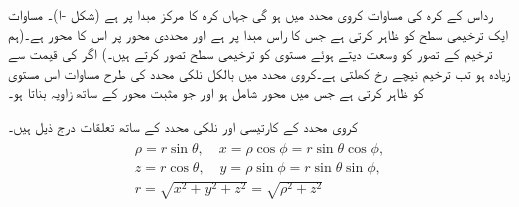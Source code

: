 رداس  کے کرہ کی مساوات کروی محدد میں    ہو گی  جہاں کرہ کا مرکز مبدا پر ہے (شکل -ا)۔ مساوات  ایک ترخیمی سطح کو ظاہر کرتی ہے جس کا راس مبدا پر ہے اور   محددی  محور  پر اس کا محور  ہے۔(ہم ترخیم کے تصور کو وسعت دیتے ہوئے مستوی  کو ترخیمی سطح   تصور کرتے ہیں۔) اگر  کی قیمت  سے زیادہ ہو تب ترخیم نیچے رخ کھلتی  ہے۔کروی محدد میں بالکل نلکی محدد کی طرح مساوات    اس مستوی کو ظاہر کرتی ہے جس میں محور  شامل ہو اور  جو مثبت محور  کے ساتھ زاویہ  بناتا ہو۔

کروی محدد کے کارتیسی اور نلکی محدد کے ساتھ تعلقات   درج ذیل ہیں۔
\begin{gather}
\begin{aligned}\label{مساوات_سمتیہ_کروی_محدد_تعلقات}
\rho=r\sin\theta,\quad x=\rho\cos\phi=r\sin\theta\cos\phi,\\
z=r\cos\theta,\quad y=\rho\sin\phi=r\sin\theta\sin\phi,\\
r=\sqrt{x^2+y^2+z^2}=\sqrt{\rho^2+z^2}
\end{aligned}
\end{gather}

